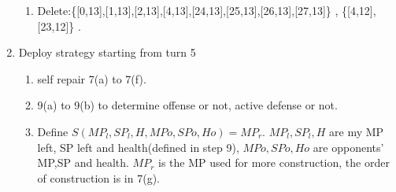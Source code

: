 \documentclass[12pt]{article}
\begin{document}
\begin{enumerate}
\begin{enumerate}
\item Delete:\{[0,13],[1,13],[2,13],[4,13],[24,13],[25,13],[26,13],[27,13]\} , \{[4,12],[23,12]\} .
\end{enumerate}
     \item Deploy strategy starting from turn 5
\begin{enumerate}
\item self repair 7(a) to 7(f).
\item 9(a) to 9(b) to determine offense or not, active defense or not.
\item Define $S(MP_l,SP_l,H,MPo,SPo,Ho) = MP_r$. $MP_l,SP_l,H$ are my MP left, SP left and health(defined in step 9), $MPo,SPo,Ho$ are opponents' MP,SP and health. $MP_r$ is the MP used for more construction, the order of construction is in 7(g).
\end{enumerate}


\end{enumerate}
\end{document}
